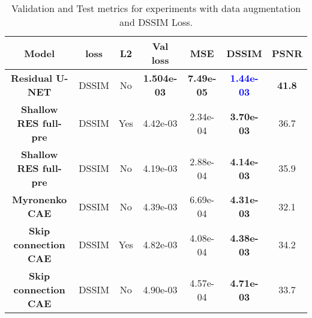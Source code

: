 \begin{table}[!ht]
  \begin{center}
   \setlength\extrarowheight{2pt} %
   \begin{tabular}{>{\bf}c c c | c | c >{\bf}c c}
    \toprule
    Model & \textbf{loss}  & \textbf{L2}  & \textbf{Val loss}  & \textbf{MSE}   & \textbf{DSSIM} & \textbf{PSNR} \\
    \hline   
    Residual U-NET        & DSSIM & No  & \textbf{1.504e-03}& \textbf{7.49e-05} & \textcolor{blue}{1.44e-03} & \textbf{41.8}  \\
    Shallow RES full-pre  & DSSIM & Yes &  4.42e-03        &  2.34e-04        & 3.70e-03	                 & 36.7       \\
    Shallow RES full-pre  & DSSIM & No  &  4.19e-03        &  2.88e-04        & 4.14e-03                     & 35.9       \\
    Myronenko CAE         & DSSIM & No  &  4.39e-03        &  6.69e-04        & 4.31e-03                     & 32.1        \\
    Skip connection CAE   & DSSIM & Yes &  4.82e-03        &  4.08e-04        & 4.38e-03                     & 34.2        \\
    Skip connection CAE   & DSSIM & No  &  4.90e-03        &  4.57e-04        & 4.71e-03                     & 33.7        \\
    \bottomrule
    \end{tabular}
    \end{center}
    \caption{Validation and Test metrics for experiments with data augmentation and DSSIM Loss.}
    \label{table:expaugMSE}
\end{table}
\fi

